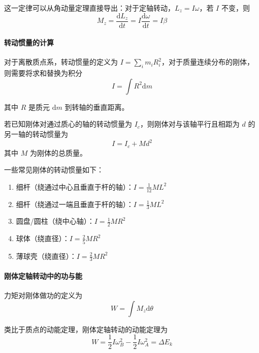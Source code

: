这一定律可以从角动量定理直接导出：对于定轴转动，$L_z = I\omega$，若 $I$ 不变，则
\begin{equation}
    M_z = \frac{\mathrm{d}L_z}{\mathrm{d}t} = I\frac{\mathrm{d}\omega}{\mathrm{d}t} = I\beta
\end{equation}

\paragraph*{转动惯量的计算} 对于离散质点系，转动惯量的定义为 $I = \sum_i m_i R_i^2$，对于质量连续分布的刚体，则需要将求和替换为积分
\begin{equation}
    I = \int R^2 \mathrm{d}m
\end{equation}

其中 $R$ 是质元 $\mathrm{d}m$ 到转轴的垂直距离。

\begin{theorem}[平行轴定理]
    若已知刚体对通过质心的轴的转动惯量为 $I_c$，则刚体对与该轴平行且相距为 $d$ 的另一轴的转动惯量为
    \begin{equation}
        I = I_c + Md^2
    \end{equation}
    其中 $M$ 为刚体的总质量。
\end{theorem}

一些常见刚体的转动惯量如下：
\begin{enumerate}
    \item 细杆（绕通过中心且垂直于杆的轴）：$\displaystyle I = \frac{1}{12}ML^2$
    \item 细杆（绕通过一端且垂直于杆的轴）：$\displaystyle I = \frac{1}{3}ML^2$
    \item 圆盘/圆柱（绕中心轴）：$\displaystyle I = \frac{1}{2}MR^2$
    \item 球体（绕直径）：$\displaystyle I = \frac{2}{5}MR^2$
    \item 薄球壳（绕直径）：$\displaystyle I = \frac{2}{3}MR^2$
\end{enumerate}

\paragraph*{刚体定轴转动中的功与能} 力矩对刚体做功的定义为
\begin{equation}
    W = \int M_z \mathrm{d}\theta
\end{equation}

类比于质点的动能定理，刚体定轴转动的动能定理为
\begin{equation}
    W = \frac{1}{2}I\omega_B^2 - \frac{1}{2}I\omega_A^2 = \Delta E_k
\end{equation}

